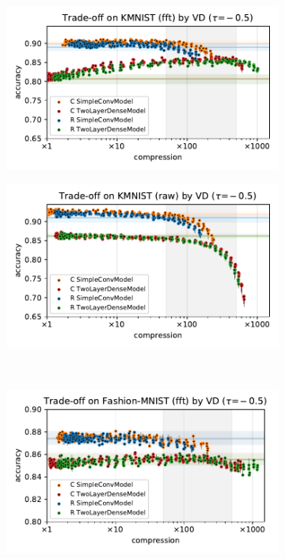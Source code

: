 \documentclass[a4paper,10pt,onecolumn]{article}
\begin{document}
\begin{figure}[b]
  \begin{subfigure}[b]{0.5\columnwidth}
    \centering
    \includegraphics[width=\columnwidth]{figure__mnist-like__trade-off/appendix__VD__kmnist__fft__-0.5.pdf}
  \end{subfigure}%
  \begin{subfigure}[b]{0.5\columnwidth}
    \centering
    \includegraphics[width=\columnwidth]{figure__mnist-like__trade-off/appendix__VD__kmnist__raw__-0.5.pdf}
  \end{subfigure} \\%
  \begin{subfigure}[b]{0.5\columnwidth}
    \centering
    \includegraphics[width=\columnwidth]{figure__mnist-like__trade-off/appendix__VD__fashionmnist__fft__-0.5.pdf}

\end{subfigure}
\end{figure}
\end{document}
